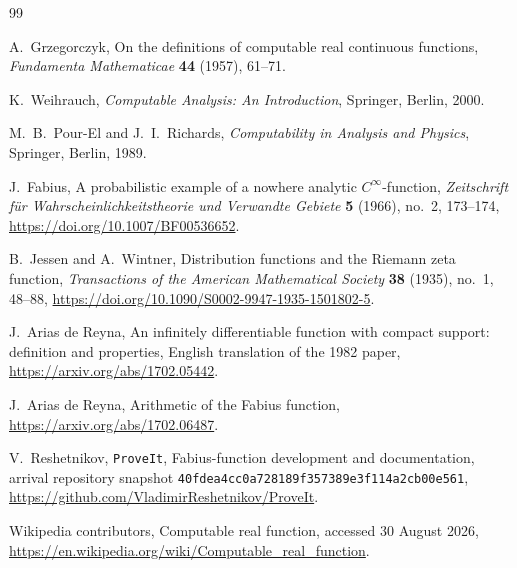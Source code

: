 \documentclass[11pt,oneside]{article}
\theoremstyle{definition}
\theoremstyle{remark}
\numberwithin{equation}{section}
\newcommand{\arrivalcommit}{\nolinkurl{40fdea4cc0a728189f357389e3f114a2cb00e561}}
\begin{document}
\begin{thebibliography}{99}

A.~Grzegorczyk,
\newblock On the definitions of computable real continuous functions,
\newblock \emph{Fundamenta Mathematicae} \textbf{44} (1957), 61--71.

K.~Weihrauch,
\newblock \emph{Computable Analysis: An Introduction},
\newblock Springer, Berlin, 2000.

M.~B.~Pour-El and J.~I.~Richards,
\newblock \emph{Computability in Analysis and Physics},
\newblock Springer, Berlin, 1989.

J.~Fabius,
\newblock A probabilistic example of a nowhere analytic $C^\infty$-function,
\newblock \emph{Zeitschrift f\"ur Wahrscheinlichkeitstheorie und Verwandte
Gebiete} \textbf{5} (1966), no.~2, 173--174,
\newblock \url{https://doi.org/10.1007/BF00536652}.

B.~Jessen and A.~Wintner,
\newblock Distribution functions and the Riemann zeta function,
\newblock \emph{Transactions of the American Mathematical Society}
\textbf{38} (1935), no.~1, 48--88,
\newblock \url{https://doi.org/10.1090/S0002-9947-1935-1501802-5}.

J.~Arias de Reyna,
\newblock An infinitely differentiable function with compact support:
definition and properties,
\newblock English translation of the 1982 paper,
\newblock \url{https://arxiv.org/abs/1702.05442}.

J.~Arias de Reyna,
\newblock Arithmetic of the Fabius function,
\newblock \url{https://arxiv.org/abs/1702.06487}.

V.~Reshetnikov,
\newblock \texttt{ProveIt}, Fabius-function development and documentation,
\newblock arrival repository snapshot \arrivalcommit,
\newblock \url{https://github.com/VladimirReshetnikov/ProveIt}.

Wikipedia contributors,
\newblock Computable real function,
\newblock accessed 30 August 2026,
\newblock \url{https://en.wikipedia.org/wiki/Computable_real_function}.

\end{thebibliography}
\end{document}
